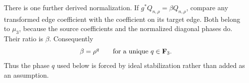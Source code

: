 There is one further derived normalization.  If
\(g^*Q_{n,\rho}=\beta Q_{n,\rho}\), compare any transformed edge
coefficient with the coefficient on its target edge.  Both belong to
\(\mu_3\), because the source coefficients and the normalized diagonal
phases do.  Their ratio is \(\beta\).  Consequently
\begin{equation}
\beta=\rho^q\qquad\text{for a unique }q\in\mathbf F_3.
\label{eq:q-derived}
\end{equation}
Thus the phase \(q\) used below is forced by ideal stabilization rather than
added as an assumption.
